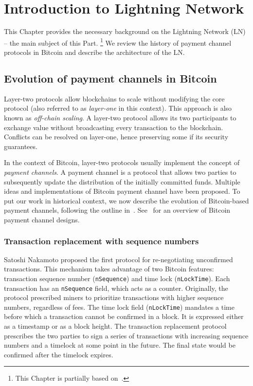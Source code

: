 \chapter{Introduction to Lightning Network}

\label{Chapter05IntroLightning}

This Chapter provides the necessary background on the Lightning Network (LN) -- the main subject of this Part.
\footnote{This Chapter is partially based on~\cite{Tikhomirov2020a}.}
We review the history of payment channel protocols in Bitcoin and describe the architecture of the LN.


\section{Evolution of payment channels in Bitcoin}

Layer-two protocols allow blockchains to scale without modifying the core protocol (also referred to as \textit{layer-one} in this context).
This approach is also known as \textit{off-chain scaling}.
A layer-two protocol allows its two participants to exchange value without broadcasting every transaction to the blockchain.
Conflicts can be resolved on layer-one, hence preserving some if its security guarantees.

In the context of Bitcoin, layer-two protocols usually implement the concept of \textit{payment channels}.
A payment channel is a protocol that allows two parties to subsequently update the distribution of the initially committed funds.
Multiple ideas and implementations of Bitcoin payment channel have been proposed.
To put our work in historical context, we now describe the evolution of Bitcoin-based payment channels, following the outline in~\cite{BitcoinWikiChannels}.
See~\cite{McCorry2016} for an overview of Bitcoin payment channel designs.


\subsection{Transaction replacement with sequence numbers}

Satoshi Nakamoto proposed the first protocol for re-negotiating unconfirmed transactions.
This mechanism takes advantage of two Bitcoin features: transaction sequence number (\texttt{nSequence}) and time lock (\texttt{nLockTime}).
Each transaction has an \texttt{nSequence} field, which acts as a counter.
Originally, the protocol prescribed miners to prioritize transactions with higher sequence numbers, regardless of fees.
The time lock field (\texttt{nLockTime}) mandates a time before which a transaction cannot be confirmed in a block.
It is expressed either as a timestamp or as a block height.
The transaction replacement protocol prescribes the two parties to sign a series of transactions with increasing sequence numbers and a timelock at some point in the future.
The final state would be confirmed after the timelock expires.


